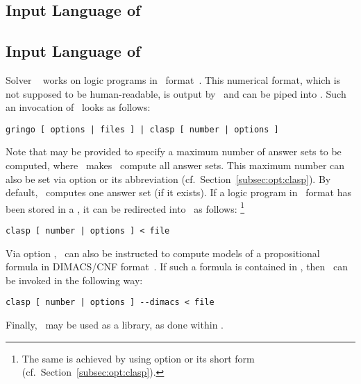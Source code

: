 \subsection{Input Language of \clingo}\label{subsec:lang:clingo}
%
\tbf
\subsection{Input Language of \clasp}\label{subsec:lang:clasp}

Solver \clasp~\cite{gekanesc07b} works on logic programs in \smodels\ format~\cite{lparseManual}.
This numerical format, which is not supposed to be human-readable,
is output by \gringo\ and can be piped into \clasp.
Such an invocation of \clasp\ looks as follows:
%
\begin{lstlisting}[numbers=none]
gringo [ options | files ] | clasp [ number | options ]
\end{lstlisting}
%
Note that  may be provided to specify a maximum number of answer sets
to be computed, where~ makes \clasp\ compute all answer sets.
This maximum number can also be set via
option  or its abbreviation 
(cf.\ Section~\ref{subsec:opt:clasp}).
By default, \clasp\ computes one answer set (if it exists).
If a logic program in \smodels\ format has been stored in a ,
it can be redirected into \clasp\ as follows:%
\footnote{%
  The same is achieved by using option  or its short form 
  (cf.\ Section~\ref{subsec:opt:clasp}).}
%
\begin{lstlisting}[numbers=none]
clasp [ number | options ] < file
\end{lstlisting}
%
Via option ,
\clasp\ can also be instructed to compute models of a propositional formula
in DIMACS/CNF format~\cite{dimacs}.
If such a formula is contained in ,
then \clasp\ can be invoked in the following way:
%
\begin{lstlisting}[numbers=none]
clasp [ number | options ] --dimacs < file
\end{lstlisting}
%
Finally, \clasp\ may be used as a library, as done within \clingo.
 
